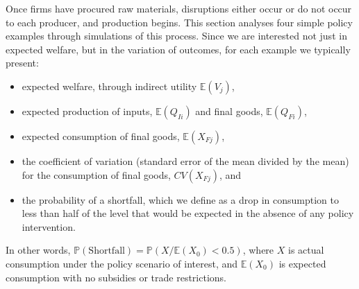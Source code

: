 \documentclass{article}
\begin{document}
Once firms have procured raw materials, disruptions either occur or do not occur to each producer, and production begins. This section analyses four simple policy examples through simulations of this process. Since we are interested not just in expected welfare, but in the variation of outcomes, for each example we typically present:
\begin{itemize}
    \item expected welfare, through indirect utility $\mathbb{E} (V_j)$, 
    \item expected production of inputs, $\mathbb{E} (Q_{Ii})$ and final goods, $\mathbb{E} (Q_{Fi})$, 
    \item expected consumption of final goods, $\mathbb{E} (X_{Fj})$, 
    \item the coefficient of variation (standard error of the mean divided by the mean) for the consumption of final goods, $CV (X_{Fj})$, and
    \item the probability of a shortfall, which we define as a drop in consumption to less than half of the level that would be expected in the absence of any policy intervention.
\end{itemize}
In other words, $\mathbb{P}(\text{Shortfall}) = \mathbb{P} (X / \mathbb{E}(X_0) < 0.5)$, where $X$ is actual consumption under the policy scenario of interest, and $\mathbb{E} (X_0)$ is expected consumption with no subsidies or trade restrictions.
\end{document}
